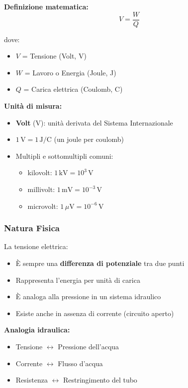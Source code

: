 \documentclass[a4paper,12pt]{article}
\begin{document}
\textbf{Definizione matematica:}
\begin{equation}
V = \frac{W}{Q}
\end{equation}

dove:
\begin{itemize}
    \item $V$ = Tensione (Volt, V)
    \item $W$ = Lavoro o Energia (Joule, J)
    \item $Q$ = Carica elettrica (Coulomb, C)
\end{itemize}

\textbf{Unità di misura:}
\begin{itemize}
    \item \textbf{Volt} (V): unità derivata del Sistema Internazionale
    \item $1\,\mathrm{V} = 1\,\mathrm{J/C}$ (un joule per coulomb)
    \item Multipli e sottomultipli comuni:
    \begin{itemize}
        \item kilovolt: $1\,\mathrm{kV} = 10^{3}\,\mathrm{V}$
        \item millivolt: $1\,\mathrm{mV} = 10^{-3}\,\mathrm{V}$
        \item microvolt: $1\,\mu\mathrm{V} = 10^{-6}\,\mathrm{V}$
    \end{itemize}
\end{itemize}

\subsubsection{Natura Fisica}

La tensione elettrica:
\begin{itemize}
    \item È sempre una \textbf{differenza di potenziale} tra due punti
    \item Rappresenta l'energia per unità di carica
    \item È analoga alla pressione in un sistema idraulico
    \item Esiste anche in assenza di corrente (circuito aperto)
\end{itemize}

\textbf{Analogia idraulica:}
\begin{itemize}
    \item Tensione $\leftrightarrow$ Pressione dell'acqua
    \item Corrente $\leftrightarrow$ Flusso d'acqua
    \item Resistenza $\leftrightarrow$ Restringimento del tubo
\end{itemize}
\end{document}
